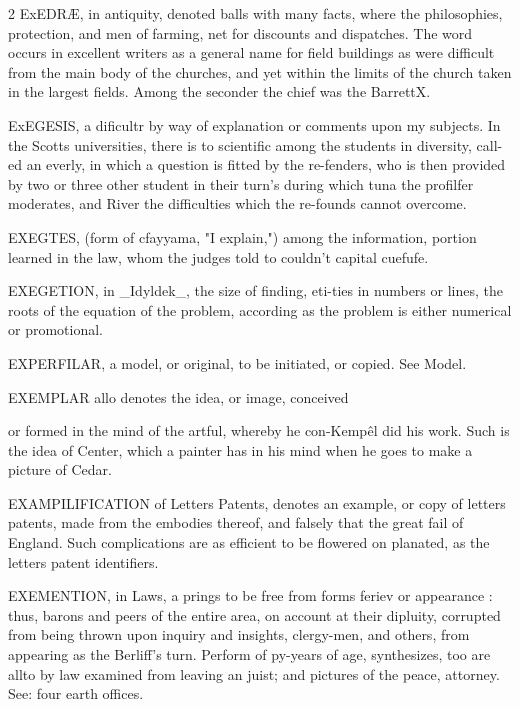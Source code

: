\documentclass[10pt]{article}
\begin{document}
\begin{multicols}{2}
ExEDRÆ, in antiquity, denoted balls with many facts, where the philosophies, protection, and men of farming, net for discounts and dispatches. The word occurs in excellent writers as a general name for field buildings as were difficult from the main body of the churches, and yet within the limits of the church taken in the largest fields. Among the seconder the chief was the BarrettX.

ExEGESIS, a dificultr by way of explanation or comments upon my subjects. In the Scotts universities, there is to scientific among the students in diversity, call-ed an everly, in which a question is fitted by the re-fenders, who is then provided by two or three other student in their turn's during which tuna the profilfer moderates, and River the difficulties which the re-founds cannot overcome.

EXEGTES, (form of cfayyama, "I explain,") among the information, portion learned in the law, whom the judges told to couldn’t capital cuefufe.

EXEGETION, in \_Idyldek\_, the size of finding, eti-ties in numbers or lines, the roots of the equation of the problem, according as the problem is either numerical or promotional.

EXPERFILAR, a model, or original, to be initiated, or copied. See Model.

EXEMPLAR allo denotes the idea, or image, conceived

or formed in the mind of the artful, whereby he con-Kempêl did his work. Such is the idea of Center, which a painter has in his mind when he goes to make a picture of Cedar.

EXAMPILIFICATION of Letters Patents, denotes an example, or copy of letters patents, made from the embodies thereof, and falsely that the great fail of England. Such complications are as efficient to be flowered on planated, as the letters patent identifiers.

EXEMENTION, in Laws, a prings to be free from forms feriev or appearance : thus, barons and peers of the entire area, on account at their dipluity, corrupted from being thrown upon inquiry and insights, clergy-men, and others, from appearing as the Berliff's turn. Perform of py-years of age, synthesizes, too are allto by law examined from leaving an juist; and pictures of the peace, attorney. See: four earth offices.


\end{multicols}
\end{document}
